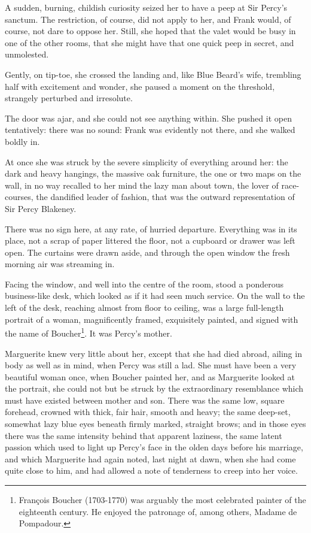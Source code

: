 \documentclass[paper=5.5in:8.5in,BCOR=7mm,twoside,DIV=calc,12pt,usegeometry,chapterprefix,endperiod,headings=big]{scrbook}
\begin{document}
A sudden, burning, childish curiosity seized her to have a peep at Sir Percy's sanctum. The restriction, of course, did not apply to her, and Frank would, of course, not dare to oppose her. Still, she hoped that the valet would be busy in one of the other rooms, that she might have that one quick peep in secret, and unmolested.

Gently, on tip-toe, she crossed the landing and, like Blue Beard's wife, trembling half with excitement and wonder, she paused a moment on the threshold, strangely perturbed and irresolute.

The door was ajar, and she could not see anything within. She pushed it open tentatively: there was no sound: Frank was evidently not there, and she walked boldly in.

At once she was struck by the severe simplicity of everything around her: the dark and heavy hangings, the massive oak furniture, the one or two maps on the wall, in no way recalled to her mind the lazy man about town, the lover of race-courses, the dandified leader of fashion, that was the outward representation of Sir Percy Blakeney.

There was no sign here, at any rate, of hurried departure. Everything was in its place, not a scrap of paper littered the floor, not a cupboard or drawer was left open. The curtains were drawn aside, and through the open window the fresh morning air was streaming in.

Facing the window, and well into the centre of the room, stood a ponderous business-like desk, which looked as if it had seen much service. On the wall to the left of the desk, reaching almost from floor to ceiling, was a large full-length portrait of a woman, magnificently framed, exquisitely painted, and signed with the name of Boucher\footnote{François Boucher (1703-1770) was arguably the most celebrated painter of the eighteenth century. He enjoyed the patronage of, among others, Madame de Pompadour.}. It was Percy's mother.

Marguerite knew very little about her, except that she had died abroad, ailing in body as well as in mind, when Percy was still a lad. She must have been a very beautiful woman once, when Boucher painted her, and as Marguerite looked at the portrait, she could not but be struck by the extraordinary resemblance which must have existed between mother and son. There was the same low, square forehead, crowned with thick, fair hair, smooth and heavy; the same deep-set, somewhat lazy blue eyes beneath firmly marked, straight brows; and in those eyes there was the same intensity behind that apparent laziness, the same latent passion which used to light up Percy's face in the olden days before his marriage, and which Marguerite had again noted, last night at dawn, when she had come quite close to him, and had allowed a note of tenderness to creep into her voice.
\end{document}
